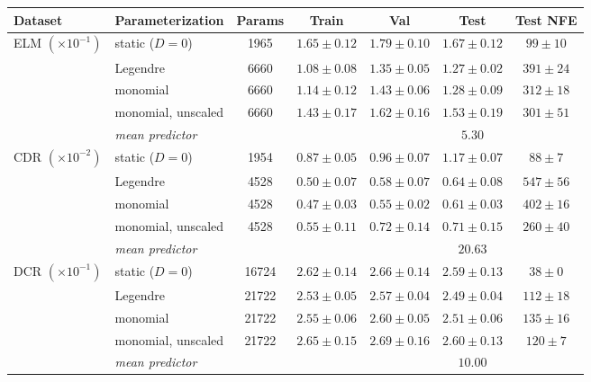 \begin{tabular}{llccccc}
\toprule
Dataset & Parameterization & Params & Train & Val & Test & Test NFE \\
\midrule
ELM $(\times 10^{-1})$ & static ($D=0$) & 1965 & $1.65 \pm 0.12$ & $1.79 \pm 0.10$ & $1.67 \pm 0.12$ & $99 \pm 10$ \\  %
 & Legendre & 6660 & $1.08 \pm 0.08$ & $1.35 \pm 0.05$ & $1.27 \pm 0.02$ & $391 \pm 24$ \\  %
 & monomial & 6660 & $1.14 \pm 0.12$ & $1.43 \pm 0.06$ & $1.28 \pm 0.09$ & $312 \pm 18$ \\  %
 & monomial, unscaled & 6660 & $1.43 \pm 0.17$ & $1.62 \pm 0.16$ & $1.53 \pm 0.19$ & $301 \pm 51$ \\  %
& \emph{mean predictor} & & & & $5.30$ & \\
\midrule
CDR $(\times 10^{-2})$ & static ($D=0$) & 1954 & $0.87 \pm 0.05$ & $0.96 \pm 0.07$ & $1.17 \pm 0.07$ & $88 \pm 7$ \\  %
 & Legendre & 4528 & $0.50 \pm 0.07$ & $0.58 \pm 0.07$ & $0.64 \pm 0.08$ & $547 \pm 56$ \\  %
 & monomial & 4528 & $0.47 \pm 0.03$ & $0.55 \pm 0.02$ & $0.61 \pm 0.03$ & $402 \pm 16$ \\  %
 & monomial, unscaled & 4528 & $0.55 \pm 0.11$ & $0.72 \pm 0.14$ & $0.71 \pm 0.15$ & $260 \pm 40$ \\  %
& \emph{mean predictor} & & & & $20.63$ & \\
\midrule
DCR $(\times 10^{-1})$ & static ($D=0$) & 16724 & $2.62 \pm 0.14$ & $2.66 \pm 0.14$ & $2.59 \pm 0.13$ & $38 \pm 0$ \\  %
 & Legendre & 21722 & $2.53 \pm 0.05$ & $2.57 \pm 0.04$ & $2.49 \pm 0.04$ & $112 \pm 18$ \\  %
 & monomial & 21722 & $2.55 \pm 0.06$ & $2.60 \pm 0.05$ & $2.51 \pm 0.06$ & $135 \pm 16$ \\  %
 & monomial, unscaled & 21722 & $2.65 \pm 0.15$ & $2.69 \pm 0.16$ & $2.60 \pm 0.13$ & $120 \pm 7$ \\  %
& \emph{mean predictor} & & & & $10.00$ & \\
\bottomrule
\end{tabular}
